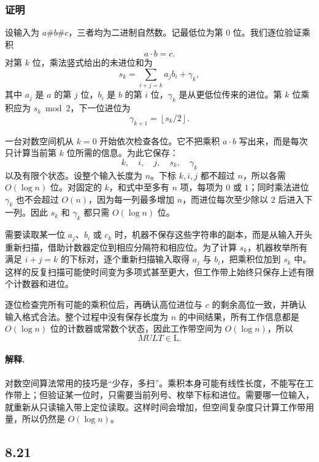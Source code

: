 \begin{answerred}
\subsubsection*{证明}

设输入为 $a\#b\#c$，三者均为二进制自然数。记最低位为第 $0$ 位。我们逐位验证乘积
\[
a\cdot b=c.
\]
对第 $k$ 位，乘法竖式给出的未进位和为
\[
s_k=\sum_{i+j=k} a_j b_i+\gamma_k,
\]
其中 $a_j$ 是 $a$ 的第 $j$ 位，$b_i$ 是 $b$ 的第 $i$ 位，$\gamma_k$ 是从更低位传来的进位。第 $k$ 位乘积应为 $s_k\bmod 2$，下一位进位为
\[
\gamma_{k+1}=\left\lfloor s_k/2\right\rfloor.
\]

一台对数空间机从 $k=0$ 开始依次检查各位。它不把乘积 $a\cdot b$ 写出来，而是每次只计算当前第 $k$ 位所需的信息。为此它保存：
\[
k,\quad i,\quad j,\quad s_k,\quad \gamma_k
\]
以及有限个状态。设整个输入长度为 $n$。下标 $k,i,j$ 都不超过 $n$，所以各需 $O(\log n)$ 位。对固定的 $k$，和式中至多有 $n$ 项，每项为 $0$ 或 $1$；同时乘法进位 $\gamma_k$ 也不会超过 $O(n)$，因为每一列最多增加 $n$，而进位每次至少除以 $2$ 后进入下一列。因此 $s_k$ 和 $\gamma_k$ 都只需 $O(\log n)$ 位。

需要读取某一位 $a_j$、$b_i$ 或 $c_k$ 时，机器不保存这些字符串的副本，而是从输入开头重新扫描，借助计数器定位到相应分隔符和相应位。为了计算 $s_k$，机器枚举所有满足 $i+j=k$ 的下标对，逐个重新扫描输入取得 $a_j$ 与 $b_i$，把乘积位加到 $s_k$ 中。这样的反复扫描可能使时间变为多项式甚至更大，但工作带上始终只保存上述有限个计数器和进位。

逐位检查完所有可能的乘积位后，再确认高位进位与 $c$ 的剩余高位一致，并确认输入格式合法。整个过程中没有保存长度为 $n$ 的中间结果，所有工作信息都是 $O(\log n)$ 位的计数器或常数个状态，因此工作带空间为 $O(\log n)$，所以
\[
MULT\in\mathrm{L}.
\]

\begin{answernote}
\paragraph{解释.}
对数空间算法常用的技巧是“少存，多扫”。乘积本身可能有线性长度，不能写在工作带上；但验证某一位时，只需要当前列号、枚举下标和进位。需要哪一位输入，就重新从只读输入带上定位读取。这样时间会增加，但空间复杂度只计算工作带用量，所以仍然是 $O(\log n)$。

\end{answernote}
\end{answerred}
\subsection*{8.21}

